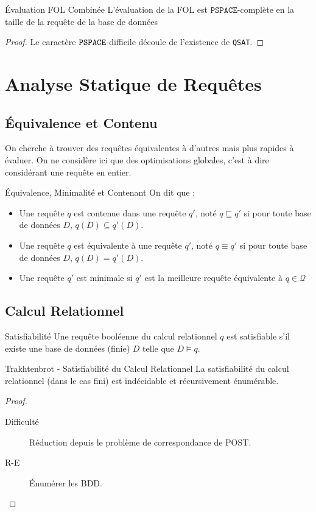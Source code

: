 \documentclass{cours}
\begin{document}
\begin{théorème}{Évaluation FOL Combinée}{}
    L'évaluation de la FOL est $\texttt{PSPACE}$-complète en la taille de la requête de la base de données
\end{théorème}
\begin{proof}
    Le caractère ${\tt PSPACE}$-difficile découle de l'existence de \texttt{QSAT}.
\end{proof}

\section{Analyse Statique de Requêtes}
\subsection{Équivalence et Contenu}
On cherche à trouver des requêtes équivalentes à d'autres mais plus rapides à évaluer. On ne considère ici que des optimisations globales, c'est à dire considérant une requête en entier.
\begin{définition}{Équivalence, Minimalité et Contenant}{}
    On dit que :
    \begin{itemize}
        \item Une requête $q$ est contenue dans une requête $q'$, noté $q \sqsubseteq q'$ si pour toute base de données $D$, $q(D) \subseteq q'(D)$.
        \item Une requête $q$ est équivalente à une requête $q'$, noté $q \equiv q'$ si pour toute base de données $D$, $q(D) = q'(D)$.
        \item Une requête $q'$ est minimale si $q'$ est la meilleure requête équivalente à $q \in \mathcal{Q}$
    \end{itemize}
\end{définition}

\subsection{Calcul Relationnel}
\begin{définition}{Satisfiabilité}{}
    Une requête booléenne du calcul relationnel $q$ est satisfiable s'il existe une base de données (finie) $D$ telle que $D \models q$.
\end{définition}

\begin{théorème}{Trakhtenbrot - Satisfiabilité du Calcul Relationnel}{}
    La satisfiabilité du calcul relationnel (dans le cas fini) est indécidable et récursivement énumérable.
\end{théorème}
\begin{proof}
    \begin{description}
        \item[Difficulté] Réduction depuis le problème de correspondance de POST. 
        \item[R-E] Énumérer les BDD.   
    \end{description}
\end{proof}
\end{document}
